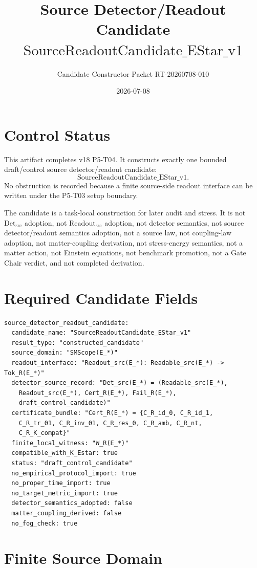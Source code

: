 \documentclass[11pt]{article}
\title{Source Detector/Readout Candidate \(\mathrm{SourceReadoutCandidate\_EStar\_v1}\)}
\author{Candidate Constructor Packet RT-20260708-010}
\date{2026-07-08}
\newcommand{\ReadoutSrc}{\mathrm{Readout}_{\mathrm{src}}}
\newcommand{\DetSrc}{\mathrm{Det}_{\mathrm{src}}}
\begin{document}
\maketitle

\section{Control Status}

This artifact completes v18 P5-T04. It constructs exactly one bounded
draft/control source detector/readout candidate:
\[
  \mathrm{SourceReadoutCandidate\_EStar\_v1}.
\]
No obstruction is recorded because a finite source-side readout interface can
be written under the P5-T03 setup boundary.

The candidate is a task-local construction for later audit and stress. It is
not \(\DetSrc\) adoption, not \(\ReadoutSrc\) adoption, not detector
semantics, not source detector/readout semantics adoption, not a source law,
not coupling-law adoption, not matter-coupling derivation, not stress-energy
semantics, not a matter action, not Einstein equations, not benchmark
promotion, not a Gate Chair verdict, and not completed derivation.

\section{Required Candidate Fields}

\begin{verbatim}
source_detector_readout_candidate:
  candidate_name: "SourceReadoutCandidate_EStar_v1"
  result_type: "constructed_candidate"
  source_domain: "SMScope(E_*)"
  readout_interface: "Readout_src(E_*): Readable_src(E_*) -> Tok_R(E_*)"
  detector_source_record: "Det_src(E_*) = (Readable_src(E_*),
    Readout_src(E_*), Cert_R(E_*), Fail_R(E_*),
    draft_control_candidate)"
  certificate_bundle: "Cert_R(E_*) = {C_R_id_0, C_R_id_1,
    C_R_tr_01, C_R_inv_01, C_R_res_0, C_R_amb, C_R_nt,
    C_R_K_compat}"
  finite_local_witness: "W_R(E_*)"
  compatible_with_K_Estar: true
  status: "draft_control_candidate"
  no_empirical_protocol_import: true
  no_proper_time_import: true
  no_target_metric_import: true
  detector_semantics_adopted: false
  matter_coupling_derived: false
  no_fog_check: true
\end{verbatim}

\section{Finite Source Domain}
\end{document}
